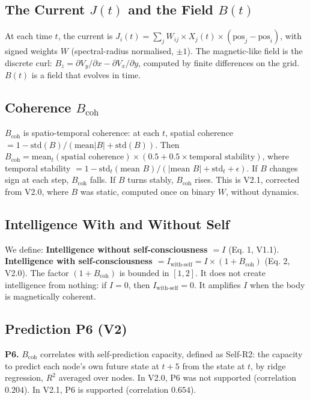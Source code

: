 \documentclass[11pt,a4paper]{article}
\begin{document}
\subsection{The Current $J(t)$ and the Field $B(t)$}
At each time $t$, the current is $J_i(t) = \sum_j W_{ij} \times X_j(t) \times (\text{pos}_j - \text{pos}_i)$, with signed weights $W$ (spectral-radius normalised, $\pm 1$). The magnetic-like field is the discrete curl: $B_z = \partial V_y / \partial x - \partial V_x / \partial y$, computed by finite differences on the grid. $B(t)$ is a field that evolves in time.

\subsection{Coherence $B_{\text{coh}}$}
$B_{\text{coh}}$ is spatio-temporal coherence: at each $t$, spatial coherence $= 1 - \text{std}(B) / (\text{mean}|B| + \text{std}(B))$. Then $B_{\text{coh}} = \text{mean}_t(\text{spatial coherence}) \times (0.5 + 0.5 \times \text{temporal stability})$, where temporal stability $= 1 - \text{std}_t(\text{mean } B) / (|\text{mean } B| + \text{std}_t + \epsilon)$. If $B$ changes sign at each step, $B_{\text{coh}}$ falls. If $B$ turns stably, $B_{\text{coh}}$ rises. This is V2.1, corrected from V2.0, where $B$ was static, computed once on binary $W$, without dynamics.

\subsection{Intelligence With and Without Self}
We define: \textbf{Intelligence without self-consciousness $= I$} (Eq. 1, V1.1). \textbf{Intelligence with self-consciousness $= I_{\text{with-self}} = I \times (1 + B_{\text{coh}})$} (Eq. 2, V2.0). The factor $(1 + B_{\text{coh}})$ is bounded in $[1,2]$. It does not create intelligence from nothing: if $I = 0$, then $I_{\text{with-self}} = 0$. It amplifies $I$ when the body is magnetically coherent.

\subsection{Prediction P6 (V2)}
\textbf{P6.} $B_{\text{coh}}$ correlates with self-prediction capacity, defined as Self-R2: the capacity to predict each node's own future state at $t+5$ from the state at $t$, by ridge regression, $R^2$ averaged over nodes. In V2.0, P6 was not supported (correlation $0.204$). In V2.1, P6 is supported (correlation $0.654$).
\end{document}
